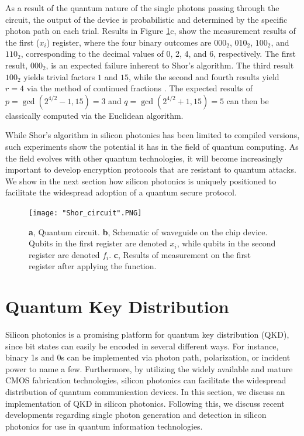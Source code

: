 \documentclass[letterpaper, 10 pt, conference]{ieeeconf}  %
\begin{document}
As a result of the quantum nature of the single photons passing through the circuit, the output of the device is probabilistic and determined by the specific photon path on each trial. Results in Figure \ref{fig:1}c, show the measurement results of the first ($x_i$) register, where the four binary outcomes are $000_2$, $010_2$, $100_2$, and $110_2$, corresponding to the decimal values of 0, 2, 4, and 6, respectively. The first result, $000_2$, is an expected failure inherent to Shor's algorithm. The third result $100_2$ yields trivial factors $1$ and $15$, while the second and fourth results yield $r=4$ via the method of continued fractions \cite{Shorphotonics}. The expected results of $p=\gcd(2^{4/2}-1,15) = 3$ and $q=\gcd(2^{4/2}+1, 15) = 5$ can then be classically computed via the Euclidean algorithm. 

While Shor's algorithm in silicon photonics has been limited to compiled versions, such experiments show the potential it has in the field of quantum computing. As the field evolves with other quantum technologies, it will become increasingly important to develop encryption protocols that are resistant to quantum attacks. We show in the next section how silicon photonics is uniquely positioned to facilitate the widespread adoption of a quantum secure protocol. 

\begin{figure}[htbp]
    \centering
    \texttt{[image: "Shor\_circuit".PNG]}
    \caption{\textbf{a}, Quantum circuit. \textbf{b}, Schematic of waveguide on the chip device. Qubits in the first register are denoted $x_i$, while qubits in the second register are denoted $f_i$. \textbf{c}, Results of measurement on the first register after applying the function. \cite{Politi}}
    \label{fig:1}
\end{figure} 

\section{Quantum Key Distribution}
Silicon photonics is a promising platform for quantum key distribution (QKD), since bit states can easily be encoded in several different ways. For instance, binary 1s and 0s can be implemented via photon path, polarization, or incident power to name a few. Furthermore, by utilizing the widely available and mature CMOS fabrication technologies, silicon photonics can facilitate the widespread distribution of quantum communication devices. In this section, we discuss an implementation of QKD in silicon photonics. Following this, we discuss recent developments regarding single photon generation and detection in silicon photonics for use in quantum information technologies.
\end{document}
